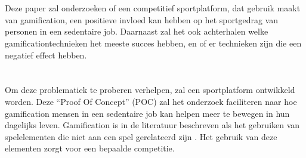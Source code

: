 
\section{}%
\label{sec:onderzoeksvraag}


Deze paper zal onderzoeken of een competitief sportplatform, dat gebruik maakt van gamification, een positieve invloed kan hebben op het sportgedrag van personen in een sedentaire job. Daarnaast zal het ook achterhalen welke gamificationtechnieken  het meeste succes hebben, en of er technieken zijn die een negatief effect hebben.

\section{}%
\label{sec:onderzoeksdoelstelling}

Om deze problematiek te proberen verhelpen, zal een sportplatform ontwikkeld worden. Deze ``Proof Of Concept'' (POC) zal het onderzoek faciliteren naar hoe gamification mensen in een sedentaire job kan helpen meer te bewegen in hun dagelijks leven. Gamification is in de literatuur beschreven als het gebruiken van spelelementen die niet aan een spel gerelateerd zijn \autocite{Gaalen2020}. Het gebruik van deze elementen zorgt voor een bepaalde competitie.


